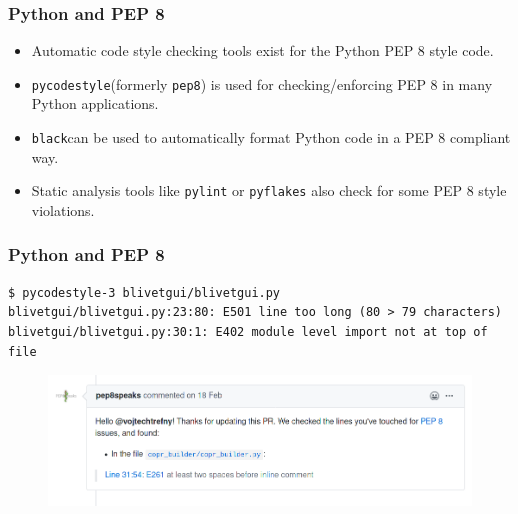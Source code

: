 \documentclass[aspectratio=169]{beamer}
\begin{document}
\begin{frame}
	\frametitle{Python and PEP 8}

	\begin{itemize}
		\item Automatic code style checking tools exist for the Python PEP 8 style code.
		\item \texttt{pycodestyle}\footnotemark (formerly \texttt{pep8}) is used for checking/enforcing PEP 8 in many Python applications.
		\item \texttt{black}\footnotemark can be used to automatically format Python code in a PEP 8 compliant way.
		\item Static analysis tools like \texttt{pylint} or \texttt{pyflakes} also check for some PEP 8 style violations.
	\end{itemize}

\end{frame}

\begin{frame}[fragile]
	\frametitle{Python and PEP 8}

\begin{lstlisting}[frame=none, basicstyle=\ttfamily\small, columns=fullflexible, keepspaces=true]
$ pycodestyle-3 blivetgui/blivetgui.py 
blivetgui/blivetgui.py:23:80: E501 line too long (80 > 79 characters)
blivetgui/blivetgui.py:30:1: E402 module level import not at top of file
\end{lstlisting}

	\begin{figure}[ht!]
	\begin{center}
  	  \includegraphics[width=13cm]{img/pep8speaks.png}
	\end{center}
	\end{figure}
\end{frame}
\end{document}
